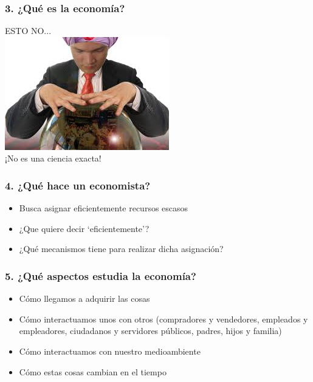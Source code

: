 \documentclass{beamer}
\begin{document}
\begin{frame}
\frametitle{3. ¿Qu\'{e} es la economía?}
ESTO NO...\vspace{1mm} \\
\centering 
\includegraphics[scale=0.7]{Figures/Introduccion_1.2_boladecristal.jpg}
\\
¡No es una ciencia exacta!
\end{frame}

\begin{frame}
\frametitle{4. ¿Qu\'{e} hace un economista?}
\begin{itemize}
    \item Busca asignar eficientemente recursos escasos \vspace{3mm} \\
    \item ¿Que quiere decir `eficientemente'? \vspace{3mm} \\
    \item ¿Qué mecanismos tiene para realizar dicha asignación? 
\end{itemize}
\end{frame}

\begin{frame}
\frametitle{5. ¿Qu\'{e} aspectos estudia la economía?}
\begin{itemize}
\begin{itemize}
    \item Cómo llegamos a adquirir las cosas \vspace{2mm}
    \item Cómo interactuamos unos con otros (compradores y vendedores, empleados y empleadores, ciudadanos y servidores públicos, padres, hijos y familia) \vspace{2mm}
    \item Cómo interactuamos con nuestro medioambiente \vspace{2mm}
    \item Cómo estas cosas cambian en el tiempo  
\end{itemize}
\end{itemize}
\end{frame}
\end{document}

